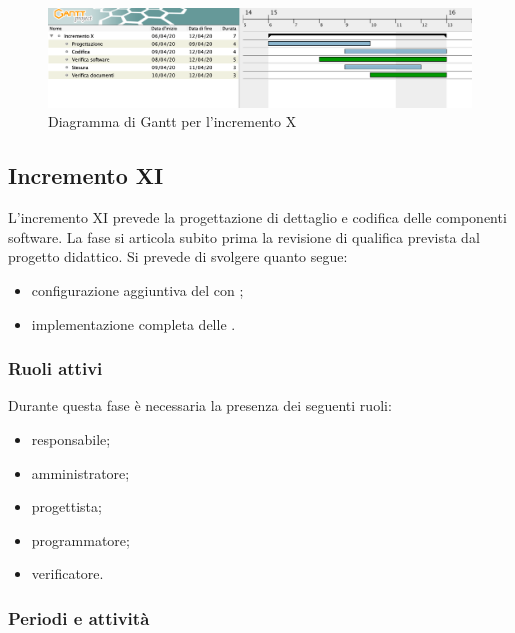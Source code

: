 		\begin{landscape}
          \begin{figure}[H]
            \centering
            \includegraphics[width=\linewidth]{images/gantt/incrementoX} %
            \caption{Diagramma di Gantt per l'incremento X}
          \end{figure}		
		\end{landscape}


		\subsection{Incremento XI}
			
			L'incremento XI prevede la progettazione di dettaglio e codifica delle componenti software. La fase si articola subito prima la revisione di qualifica prevista dal progetto didattico. Si prevede di svolgere quanto segue:
			\begin{itemize}
				\item configurazione aggiuntiva del  con ;
				\item implementazione completa delle .
			\end{itemize}
			
			\subsubsection{Ruoli attivi}
			
				Durante questa fase è necessaria la presenza dei seguenti ruoli:
				\begin{itemize}
					\item responsabile;
					\item amministratore;
					\item progettista;
					\item programmatore;
					\item verificatore.
				\end{itemize}
			
			\subsubsection{Periodi e attività}
			
